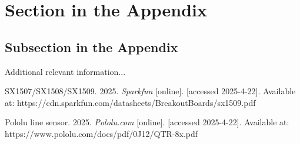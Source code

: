 \documentclass[english]{article}
\begin{document}









\clearpage
\appendix

\section{Section in the Appendix}
\label{sec:app1}

\subsection{Subsection in the Appendix}
\label{subsec:app2}

Additional relevant information...


\begin{thebibliography}{1}
	
	SX1507/SX1508/SX1509. 2025. \textit{Sparkfun} [online]. [accessed 2025-4-22]. Available at: https://cdn.sparkfun.com/datasheets/BreakoutBoards/sx1509.pdf
	
	Pololu line sensor. 2025. \textit{Pololu.com} [online]. [accessed 2025-4-22]. Available at: https://www.pololu.com/docs/pdf/0J12/QTR-8x.pdf

\end{thebibliography}
\end{document}
